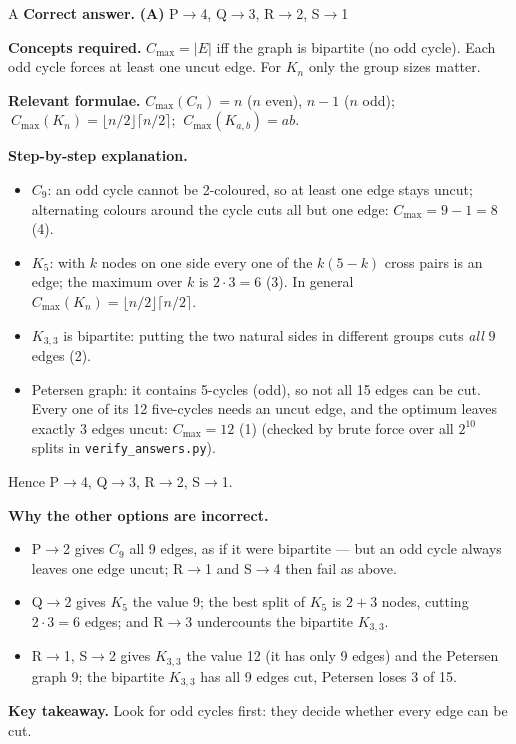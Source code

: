 \documentclass[11pt,a4paper]{article}
\newcommand{\qsep}{\par\vspace{2pt}{\color{black!15}\hrule}\vspace{4pt}}
\begin{document}
\begin{solbox}{A}
\textbf{\color{brand}Correct answer.} \textcolor{okgreen}{\textbf{(A)}} P$\to$4, Q$\to$3, R$\to$2, S$\to$1

\textbf{\color{brand}Concepts required.} $C_{\max} = |E|$ iff the graph is bipartite (no odd cycle). Each odd cycle forces at least one uncut edge. For $K_n$ only the group sizes matter.

\textbf{\color{brand}Relevant formulae.} $C_{\max}(C_n) = n$ ($n$ even), $n - 1$ ($n$ odd); $\ C_{\max}(K_n) = \lfloor n/2\rfloor\lceil n/2\rceil$; $\ C_{\max}(K_{a,b}) = ab$.

\textbf{\color{brand}Step-by-step explanation.} \begin{itemize}\itemsep0pt
\item $C_9$: an odd cycle cannot be 2-coloured, so at least one edge stays uncut; alternating colours around the cycle
cuts all but one edge: $C_{\max} = 9 - 1 = 8$ (4).
\item $K_5$: with $k$ nodes on one side every one of the $k(5-k)$ cross pairs is an edge; the maximum over $k$ is
$2 \cdot 3 = 6$ (3). In general $C_{\max}(K_n) = \lfloor n/2\rfloor\lceil n/2\rceil$.
\item $K_{3,3}$ is bipartite: putting the two natural sides in different groups cuts \emph{all} $9$ edges (2).
\item Petersen graph: it contains 5-cycles (odd), so not all 15 edges can be cut. Every one of its 12 five-cycles needs
an uncut edge, and the optimum leaves exactly 3 edges uncut: $C_{\max} = 12$ (1) (checked by brute force over all
$2^{10}$ splits in \texttt{verify\_answers.py}).
\end{itemize}
Hence P$\to$4, Q$\to$3, R$\to$2, S$\to$1.

\textbf{\color{brand}Why the other options are incorrect.}
\begin{itemize}[leftmargin=2.4em, itemsep=1pt, topsep=2pt]
\item[\textbf{(B)}] P$\to$2 gives $C_9$ all 9 edges, as if it were bipartite --- but an odd cycle always leaves one edge uncut; R$\to$1 and S$\to$4 then fail as above.
\item[\textbf{(C)}] Q$\to$2 gives $K_5$ the value 9; the best split of $K_5$ is $2 + 3$ nodes, cutting $2\cdot3 = 6$ edges; and R$\to$3 undercounts the bipartite $K_{3,3}$.
\item[\textbf{(D)}] R$\to$1, S$\to$2 gives $K_{3,3}$ the value 12 (it has only 9 edges) and the Petersen graph 9; the bipartite $K_{3,3}$ has all 9 edges cut, Petersen loses 3 of 15.
\end{itemize}
\textbf{\color{brand}Key takeaway.} Look for odd cycles first: they decide whether every edge can be cut.
\end{solbox}
\qsep
\end{document}

